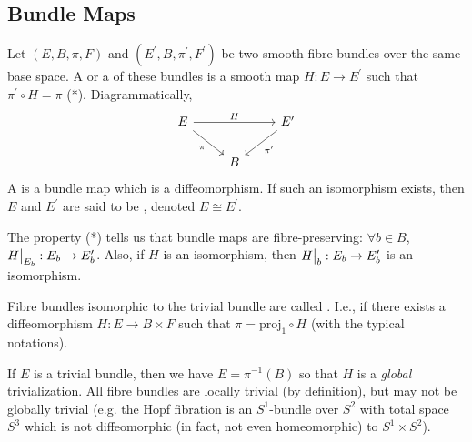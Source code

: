 \documentclass[main.tex]{subfiles}
\begin{document}
 \subsection{Bundle Maps}

 \begin{defn}
 Let $(E, B, \pi, F)$ and $(E^\prime, B, \pi^\prime, F^\prime)$ be two smooth fibre bundles over the same base space. A  or a  of these bundles is a smooth map $H: E \to E^\prime$ such that $\pi^\prime \circ H = \pi$ (*). Diagrammatically,
 \[
 \begin{tikzcd}
E \arrow[rd, "\pi"'] \arrow[rr, "H"] &   & E^\prime \arrow[ld, "\pi^\prime"] \\
                                     & B &
\end{tikzcd}
 \]
 A   is a bundle map which is a diffeomorphism. If such an isomorphism exists, then $E$ and $E^\prime$ are said to be , denoted $E \cong E^\prime$.
 \end{defn}

 \begin{note}
 The property (*) tells us that bundle maps are fibre-preserving: $\forall b \in B$, $H\big|_{E_b} : E_b \to E^\prime_b$. Also, if $H$ is an isomorphism, then $H\big|_{b}: E_b \to E^\prime_b$ is an isomorphism.
 \end{note}

 \begin{defn}
 Fibre bundles isomorphic to the trivial bundle are called . I.e., if there exists a diffeomorphism $H: E \to B \times F$ such that $\pi = \text{proj}_1 \circ H$ (with the typical notations).
 \end{defn}

 \begin{note}
 If $E$ is a trivial bundle, then we have $E = \pi^{-1}(B)$ so that $H$ is a {\it global} trivialization. All fibre bundles are locally trivial (by definition), but may not be globally trivial (e.g. the Hopf fibration is an $S^1$-bundle over $S^2$ with total space $S^3$ which is not diffeomorphic (in fact, not even homeomorphic) to $S^1 \times S^2$).
 \end{note}
\end{document}
